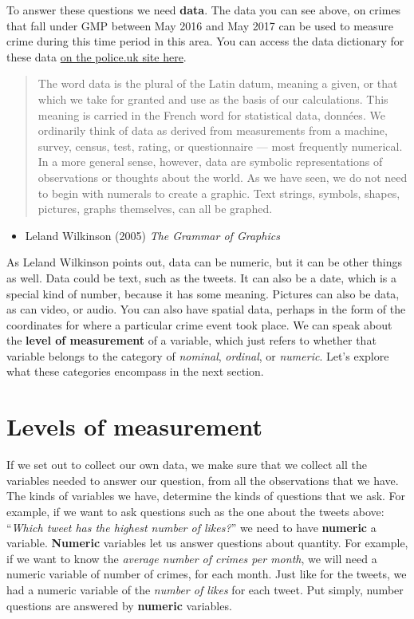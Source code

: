 \documentclass[]{book}
\providecommand{\tightlist}{%
  \setlength{\itemsep}{0pt}\setlength{\parskip}{0pt}}
\theoremstyle{definition}
\theoremstyle{definition}
\theoremstyle{definition}
\theoremstyle{remark}
\begin{document}
To answer these questions we need \textbf{data}. The data you can see
above, on crimes that fall under GMP between May 2016 and May 2017 can
be used to measure crime during this time period in this area. You can
access the data dictionary for these data
\href{https://data.police.uk/about/\#columns}{on the police.uk site
here}.

\begin{quote}
The word data is the plural of the Latin datum, meaning a given, or that
which we take for granted and use as the basis of our calculations. This
meaning is carried in the French word for statistical data, données. We
ordinarily think of data as derived from measurements from a machine,
survey, census, test, rating, or questionnaire --- most frequently
numerical. In a more general sense, however, data are symbolic
representations of observations or thoughts about the world. As we have
seen, we do not need to begin with numerals to create a graphic. Text
strings, symbols, shapes, pictures, graphs themselves, can all be
graphed.
\end{quote}

\begin{itemize}
\tightlist
\item
  Leland Wilkinson (2005) \emph{The Grammar of Graphics}
\end{itemize}

As Leland Wilkinson points out, data can be numeric, but it can be other
things as well. Data could be text, such as the tweets. It can also be a
date, which is a special kind of number, because it has some meaning.
Pictures can also be data, as can video, or audio. You can also have
spatial data, perhaps in the form of the coordinates for where a
particular crime event took place. We can speak about the \textbf{level
of measurement} of a variable, which just refers to whether that
variable belongs to the category of \emph{nominal}, \emph{ordinal}, or
\emph{numeric}. Let's explore what these categories encompass in the
next section.

\hypertarget{levels-of-measurement}{%
\section{Levels of measurement}\label{levels-of-measurement}}

If we set out to collect our own data, we make sure that we collect all
the variables needed to answer our question, from all the observations
that we have. The kinds of variables we have, determine the kinds of
questions that we ask. For example, if we want to ask questions such as
the one about the tweets above: ``\emph{Which tweet has the highest
number of likes?}'' we need to have \textbf{numeric} a variable.
\textbf{Numeric} variables let us answer questions about quantity. For
example, if we want to know the \emph{average number of crimes per
month}, we will need a numeric variable of number of crimes, for each
month. Just like for the tweets, we had a numeric variable of the
\emph{number of likes} for each tweet. Put simply, number questions are
answered by \textbf{numeric} variables.
\end{document}
